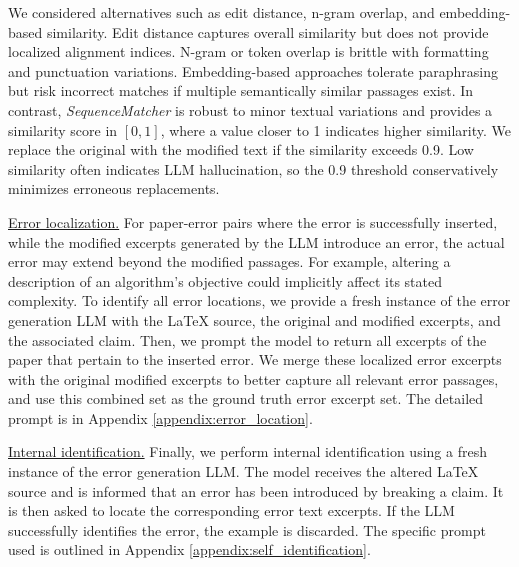 \documentclass{article}
\begin{document}
We considered alternatives such as edit distance, n-gram overlap, and embedding-based similarity. Edit distance captures overall similarity but does not provide localized alignment indices. N-gram or token overlap is brittle with formatting and punctuation variations. Embedding-based approaches tolerate paraphrasing but risk incorrect matches if multiple semantically similar passages exist. In contrast, \textit{SequenceMatcher} is robust to minor textual variations and provides a similarity score in $[0,1]$, where a value closer to 1 indicates higher similarity. We replace the original with the modified text if the similarity exceeds 0.9. Low similarity often indicates LLM hallucination, so the 0.9 threshold conservatively minimizes erroneous replacements. 

\underline{Error localization.}
For paper-error pairs where the error is successfully inserted, while the modified excerpts generated by the LLM introduce an error, the actual error may extend beyond the modified passages. For example, altering a description of an algorithm's objective could implicitly affect its stated complexity. To identify all error locations, we provide a fresh instance of the error generation LLM with the LaTeX source, the original and modified excerpts, and the associated claim. Then, we prompt the model to return all excerpts of the paper that pertain to the inserted error. We merge these localized error excerpts with the original modified excerpts to better capture all relevant error passages, and use this combined set as the ground truth error excerpt set. The detailed prompt is in Appendix \ref{appendix:error_location}.

\underline{Internal identification.} Finally, we perform internal identification using a fresh instance of the error generation LLM. The model receives the altered LaTeX source and is informed that an error has been introduced by breaking a claim. It is then asked to locate the corresponding error text excerpts. If the LLM successfully identifies the error, the example is discarded. The specific prompt used is outlined in Appendix \ref{appendix:self_identification}.
\end{document}
